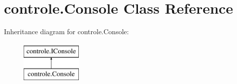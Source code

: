\hypertarget{classcontrole_1_1_console}{\section{controle.\-Console Class Reference}
\label{classcontrole_1_1_console}
}
Inheritance diagram for controle.\-Console\-:\begin{figure}[H]
\begin{center}
\leavevmode
\includegraphics[height=2.000000cm]{classcontrole_1_1_console}
\end{center}
\end{figure}
